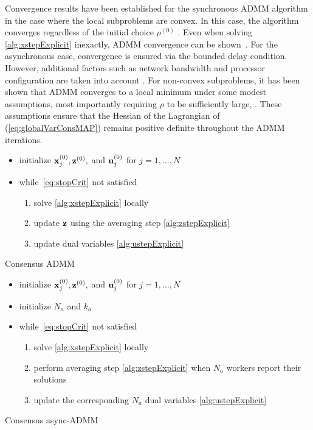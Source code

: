 \documentclass[11pt]{article}          %
\newcommand{\bfx}{{\bf  x}}
\newcommand{\bfu}{{\bf u}}
\newcommand{\bfz}{{\bf z}}
\begin{document}
Convergence results have been established for the synchronous ADMM algorithm in the case where the local subproblems are convex. In this case, the algorithm converges regardless of the initial choice $\rho^{(0)}$ \cite{hong2017linear,eckstein1992douglas}.
Even when solving \eqref{alg:xstepExplicit} inexactly, ADMM convergence can be shown~\cite[Sec. 4]{hong2017linear}.
For the asynchronous case, convergence is ensured via the bounded delay condition. However, additional factors such as network bandwidth and processor configuration are taken into account \cite{zhang2014asynchronous}. For non-convex subproblems, it has been shown that ADMM converges to a local minimum under some modest assumptions, most importantly requiring $\rho$ to be sufficiently large, \cite{Macdonald2018,wright1999numerical,hong2016convergence}. These assumptions ensure that the Hessian of the Lagrangian of (\ref{eq:globalVarConsMAP}) remains positive definite throughout the ADMM iterations.
\begin{algorithm}[t]
  \begin{itemize}
    \item initialize $\bfx_j^{(0)}, \bfz^{(0)},$ and $\bfu_j^{(0)}$ for $  j=1,\ldots,N$
    \item while~\eqref{eq:stopCrit} not satisfied
    \begin{enumerate}
      \item solve \eqref{alg:xstepExplicit} locally
      \item update $\bfz$ using the averaging step \eqref{alg:zstepExplicit}
      \item update dual variables \eqref{alg:ustepExplicit}
    \end{enumerate}
  \end{itemize}
 \caption{Consensus ADMM}
 \label{alg:wADMM}
\end{algorithm}
\begin{algorithm}[t]
  \begin{itemize}
    \item initialize $\bfx_j^{(0)}, \bfz^{(0)},$ and $\bfu_j^{(0)}$ for $ j=1,\ldots,N$
    \item initialize $N_a$ and $k_a$
    \item while~\eqref{eq:stopCrit} not satisfied
    \begin{enumerate}
      \item solve \eqref{alg:xstepExplicit} locally
      \item perform averaging step \eqref{alg:zstepExplicit} when $N_a$ workers report their solutions
      \item update the corresponding $N_a$ dual variables \eqref{alg:ustepExplicit}
    \end{enumerate}
  \end{itemize}
 \caption{Consensus async-ADMM}
 \label{alg:async-wADMM}
\end{algorithm}
\end{document}
